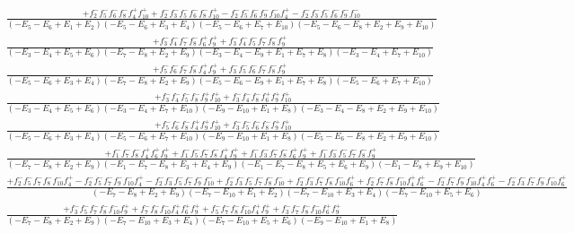\documentclass{article}
\begin{document}
\[\begin{array}{rcl}
\frac{+f_{2}^{-}f_{5}^{-}f_{6}^{-}f_{8}^{-}f_{4}^{+}f_{10}^{+}+f_{2}^{-}f_{3}^{-}f_{5}^{-}f_{6}^{-}f_{8}^{-}f_{10}^{+}-f_{2}^{-}f_{5}^{-}f_{6}^{-}f_{9}^{-}f_{10}^{-}f_{4}^{+}-f_{2}^{-}f_{3}^{-}f_{5}^{-}f_{6}^{-}f_{9}^{-}f_{10}^{-}}{(-E_{5}-E_{6}+E_{1}+E_{2})(-E_{5}-E_{6}+E_{3}+E_{4})(-E_{5}-E_{6}+E_{7}+E_{10})(-E_{5}-E_{6}-E_{8}+E_{2}+E_{9}+E_{10})}\\
\frac{+f_{3}^{-}f_{4}^{-}f_{7}^{-}f_{8}^{-}f_{6}^{+}f_{9}^{+}+f_{3}^{-}f_{4}^{-}f_{5}^{-}f_{7}^{-}f_{8}^{-}f_{9}^{+}}{(-E_{3}-E_{4}+E_{5}+E_{6})(-E_{7}-E_{8}+E_{2}+E_{9})(-E_{3}-E_{4}-E_{9}+E_{1}+E_{7}+E_{8})(-E_{3}-E_{4}+E_{7}+E_{10})}\\
\frac{+f_{5}^{-}f_{6}^{-}f_{7}^{-}f_{8}^{-}f_{4}^{+}f_{9}^{+}+f_{3}^{-}f_{5}^{-}f_{6}^{-}f_{7}^{-}f_{8}^{-}f_{9}^{+}}{(-E_{5}-E_{6}+E_{3}+E_{4})(-E_{7}-E_{8}+E_{2}+E_{9})(-E_{5}-E_{6}-E_{9}+E_{1}+E_{7}+E_{8})(-E_{5}-E_{6}+E_{7}+E_{10})}\\
\frac{+f_{3}^{-}f_{4}^{-}f_{5}^{-}f_{8}^{-}f_{9}^{+}f_{10}^{+}+f_{3}^{-}f_{4}^{-}f_{8}^{-}f_{6}^{+}f_{9}^{+}f_{10}^{+}}{(-E_{3}-E_{4}+E_{5}+E_{6})(-E_{3}-E_{4}+E_{7}+E_{10})(-E_{9}-E_{10}+E_{1}+E_{8})(-E_{3}-E_{4}-E_{8}+E_{2}+E_{9}+E_{10})}\\
\frac{+f_{5}^{-}f_{6}^{-}f_{8}^{-}f_{4}^{+}f_{9}^{+}f_{10}^{+}+f_{3}^{-}f_{5}^{-}f_{6}^{-}f_{8}^{-}f_{9}^{+}f_{10}^{+}}{(-E_{5}-E_{6}+E_{3}+E_{4})(-E_{5}-E_{6}+E_{7}+E_{10})(-E_{9}-E_{10}+E_{1}+E_{8})(-E_{5}-E_{6}-E_{8}+E_{2}+E_{9}+E_{10})}\\
\frac{+f_{1}^{-}f_{7}^{-}f_{8}^{-}f_{4}^{+}f_{6}^{+}f_{9}^{+}+f_{1}^{-}f_{5}^{-}f_{7}^{-}f_{8}^{-}f_{4}^{+}f_{9}^{+}+f_{1}^{-}f_{3}^{-}f_{7}^{-}f_{8}^{-}f_{6}^{+}f_{9}^{+}+f_{1}^{-}f_{3}^{-}f_{5}^{-}f_{7}^{-}f_{8}^{-}f_{9}^{+}}{(-E_{7}-E_{8}+E_{2}+E_{9})(-E_{1}-E_{7}-E_{8}+E_{3}+E_{4}+E_{9})(-E_{1}-E_{7}-E_{8}+E_{5}+E_{6}+E_{9})(-E_{1}-E_{8}+E_{9}+E_{10})}\\
\frac{+f_{2}^{-}f_{5}^{-}f_{7}^{-}f_{8}^{-}f_{10}^{-}f_{4}^{+}-f_{2}^{-}f_{5}^{-}f_{7}^{-}f_{9}^{-}f_{10}^{-}f_{4}^{+}-f_{2}^{-}f_{3}^{-}f_{5}^{-}f_{7}^{-}f_{9}^{-}f_{10}^{-}+f_{2}^{-}f_{3}^{-}f_{5}^{-}f_{7}^{-}f_{8}^{-}f_{10}^{-}+f_{2}^{-}f_{3}^{-}f_{7}^{-}f_{8}^{-}f_{10}^{-}f_{6}^{+}+f_{2}^{-}f_{7}^{-}f_{8}^{-}f_{10}^{-}f_{4}^{+}f_{6}^{+}-f_{2}^{-}f_{7}^{-}f_{9}^{-}f_{10}^{-}f_{4}^{+}f_{6}^{+}-f_{2}^{-}f_{3}^{-}f_{7}^{-}f_{9}^{-}f_{10}^{-}f_{6}^{+}}{(-E_{7}-E_{8}+E_{2}+E_{9})(-E_{7}-E_{10}+E_{1}+E_{2})(-E_{7}-E_{10}+E_{3}+E_{4})(-E_{7}-E_{10}+E_{5}+E_{6})}\\
\frac{+f_{3}^{-}f_{5}^{-}f_{7}^{-}f_{8}^{-}f_{10}^{-}f_{9}^{+}+f_{7}^{-}f_{8}^{-}f_{10}^{-}f_{4}^{+}f_{6}^{+}f_{9}^{+}+f_{5}^{-}f_{7}^{-}f_{8}^{-}f_{10}^{-}f_{4}^{+}f_{9}^{+}+f_{3}^{-}f_{7}^{-}f_{8}^{-}f_{10}^{-}f_{6}^{+}f_{9}^{+}}{(-E_{7}-E_{8}+E_{2}+E_{9})(-E_{7}-E_{10}+E_{3}+E_{4})(-E_{7}-E_{10}+E_{5}+E_{6})(-E_{9}-E_{10}+E_{1}+E_{8})}\\

\end{array}\]
\end{document}
